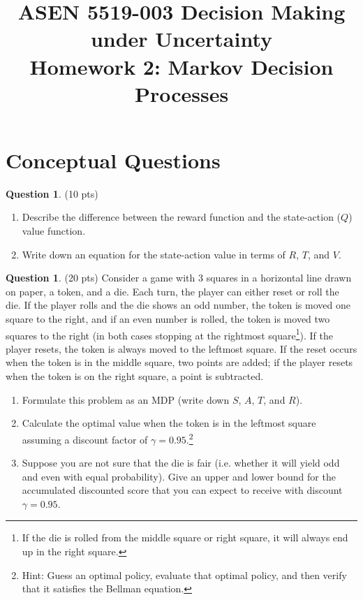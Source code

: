 \documentclass{article}
\title{ASEN 5519-003 Decision Making under Uncertainty\\
       Homework 2: Markov Decision Processes}
\theoremstyle{definition}
\newtheorem{question}[thm]{Question}
\begin{document}
\maketitle

\section{Conceptual Questions}

\begin{question} (10 pts)
    \begin{enumerate}[label=\alph*)]
        \item Describe the difference between the reward function and the state-action ($Q$) value function.
        \item Write down an equation for the state-action value in terms of $R$, $T$, and $V$.
    \end{enumerate}
\end{question}

\begin{question} (20 pts)
    Consider a game with 3 squares in a horizontal line drawn on paper, a token, and a die. Each turn, the player can either reset or roll the die. If the player rolls and the die shows an odd number, the token is moved one square to the right, and if an even number is rolled, the token is moved two squares to the right (in both cases stopping at the rightmost square\footnote{If the die is rolled from the middle square or right square, it will always end up in the right square.}). If the player resets, the token is always moved to the leftmost square. If the reset occurs when the token is in the middle square, two points are added; if the player resets when the token is on the right square, a point is subtracted.
    \begin{enumerate}[label=\alph*)]
        \item Formulate this problem as an MDP (write down $S$, $A$, $T$, and $R$).
        \item Calculate the optimal value when the token is in the leftmost square assuming a discount factor of $\gamma = 0.95$.\footnote{Hint: Guess an optimal policy, evaluate that optimal policy, and then verify that it satisfies the Bellman equation.}
        \item Suppose you are not sure that the die is fair (i.e. whether it will yield odd and even with equal probability). Give an upper and lower bound for the accumulated discounted score that you can expect to receive with discount $\gamma = 0.95$.
    \end{enumerate}
\end{question}
\end{document}
